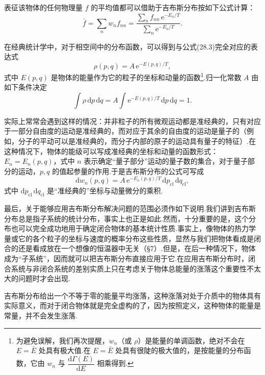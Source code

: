 表征该物体的任何物理量 $f$ 的平均值都可以借助于吉布斯分布按如下公式计算：
\begin{equation}
  \bar{f}=\sum_n w_nf_{nn}
  =\frac{\displaystyle\sum_n f_{nn}\,\mathrm{e}^{-E_n/T}}{\displaystyle\sum_n\mathrm{e}^{-E_n/T}}.
\end{equation}

在经典统计学中，对于相空间中的分布函数，可以得到与公式(28.3)完全对应的表达式
\begin{equation}
  \rho(p,q)=A\,\mathrm{e}^{-E(p,q)/T},
\end{equation}
式中 $E(p,q)$ 是物体的能量作为它的粒子的坐标和动量的函数\footnote{为避免误解，我们再次提醒，$w_n$（或 $\rho$）是能量的单调函数，绝对不会在 $E=\bar{E}$ 处具有极大值.在 $E=\bar{E}$ 处具有很陡的极大值的，是按能量的分布函数，它由 $w_n$ 与 $\dfrac{\mathrm{d}\varGamma(E)}{\mathrm{d}E}$ 相乘得到.}.归一化常数 $A$ 由如下条件决定
\begin{equation}
  \int\rho\,\mathrm{d}p\,\mathrm{d}q=A\int\mathrm{e}^{-E(p,q)/T}\,\mathrm{d}p\,\mathrm{d}q=1.
\end{equation}

实际上常常会遇到这样的情况：并非粒子的所有微观运动都是准经典的，只有对应于一部分自由度的运动是准经典的，而对应于其余的自由度的运动是量子的（例如，分子的平动可以是准经典的，而分子内部的原子的运动具有量子的特征）.在这种情况下，物体的能级可以写成准经典的坐标和动量的函数形式：$E_n=E_n(p,q)$，式中 $n$ 表示确定“量子部分”运动的量子数的集合，对于量子部分的运动，$p,q$ 的值起参量的作用.于是吉布斯分布的公式可写成
\begin{equation}
  \mathrm{d}w_n(p,q)=A\,\mathrm{e}^{-E_n(p,q)/T}\,\mathrm{d}p_{\mathrm{cl}}\,\mathrm{d}q_{\mathrm{cl}},
\end{equation}
式中 $\mathrm{d}p_{\mathrm{cl}}\,\mathrm{d}q_{\mathrm{cl}}$ 是“准经典的”坐标与动量微分的乘积.

最后，关于能够应用吉布斯分布解决问题的范围必须作如下说明.我们讲到吉布斯分布总是指子系统的统计分布，事实上也正是如此.然而，十分重要的是，这个分布也可以完全成功地用于确定闭合物体的基本统计性质.事实上，像物体的热力学量或它的各个粒子的坐标与速度的概率分布这些性质，显然与我们把物体看成是闭合的还是看成放在一个想像的恒温器中无关（§7）.但是，在后一种情况下，物体成为“子系统”，因而就可以把吉布斯分布直接应用于它.在应用吉布斯分布时，闭合系统与非闭合系统的差别实质上只在考虑关于物体总能量的涨落这个重要性不太大的问题时才会出现.

吉布斯分布给出一个不等于零的能量平均涨落，这种涨落对处于介质中的物体具有实际意义，而对于闭合物体就是完全虚构的了，因为按照定义，这种物体的能量是常量，并不会发生涨落.

